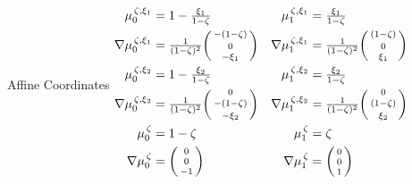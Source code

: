 \begin{center}
\begin{tabular}
{\begin{minipage}{0.55\textwidth}
	\begin{center}
		Affine Coordinates
		$	\begin{alignedat}{4}
		{}&{}&&{}&&{}\\[-7pt]
		\mu_0^{\,\zeta,\xi_1}&=1-\textstyle{\frac{\xi_1}{1-\zeta}}\,\quad &&\phantom{\nabla}\mu_1^{\,\zeta,\xi_1}&&=\textstyle{\frac{\xi_1}{1-\zeta}}\\
		\nabla\mu_0^{\,\zeta,\xi_1}&=
			\textstyle{\frac{1}{(1-\zeta)^2}}\bigg(\begin{smallmatrix}-(1-\zeta)\\[2pt]0\\[2pt]-\xi_1\end{smallmatrix}\bigg)\quad 
				&&\nabla\mu_1^{\,\zeta,\xi_1}&&=
					\textstyle{\frac{1}{(1-\zeta)^2}}\bigg(\begin{smallmatrix}(1-\zeta)\\[2pt]0\\[2pt]\xi_1\end{smallmatrix}\bigg)\\
		\mu_0^{\,\zeta,\xi_2}&=1-\textstyle{\frac{\xi_2}{1-\zeta}}\,\quad &&\phantom{\nabla}\mu_1^{\,\zeta,\xi_2}&&=\textstyle{\frac{\xi_2}{1-\zeta}}\\
		\nabla\mu_0^{\,\zeta,\xi_2}&=
			\textstyle{\frac{1}{(1-\zeta)^2}}\bigg(\begin{smallmatrix}0\\[2pt]-(1-\zeta)\\[2pt]-\xi_2\end{smallmatrix}\bigg)\quad 
				&&\nabla\mu_1^{\,\zeta,\xi_2}&&=
					\textstyle{\frac{1}{(1-\zeta)^2}}\bigg(\begin{smallmatrix}0\\[2pt](1-\zeta)\\[2pt]\xi_2\end{smallmatrix}\bigg)\\
		\mu_0^{\,\zeta}&=1-\zeta\,\quad &&\quad\phantom{\nabla}\mu_1^{\,\zeta}&&=\zeta\\
		\nabla\mu_0^{\,\zeta}&=\bigg(\begin{smallmatrix}0\\[2pt]0\\[2pt]-1\end{smallmatrix}\bigg)\quad 
			&&\quad\nabla\mu_1^{\,\zeta}&&=\bigg(\begin{smallmatrix}0\\[2pt]0\\[2pt]1\end{smallmatrix}\bigg)
	\end{alignedat}$
	\end{center}

\end{minipage}}
\end{tabular}
\end{center}
